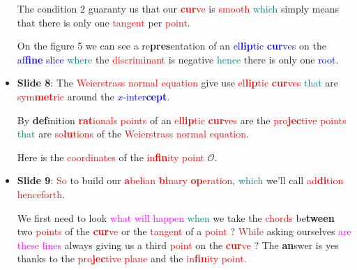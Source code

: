 \begin{itemize}
            The condition 2 guaranty us that our \textcolor{red}{\textbf{cur}ve} is
            \textcolor{red}{smooth} \textcolor{teal}{which} simply means that
            there is only one \textcolor{red}{tangent} per \textcolor{red}{point}.

            On the figure 5 we can see a re\textbf{pres}entation of an \textcolor{blue}{el\textbf{lip}tic \textbf{cur}ves}
            on the \textcolor{blue}{af\textbf{fine}
            slice} \textcolor{teal}{where} the \textcolor{red}{discriminant} is negative \textcolor{teal}{hence} there is only one
            \textcolor{blue}{root}.
        \item \textbf{Slide 8}: The \textcolor{red}{Weierstrass normal
                equation} give use \textcolor{red}{el\textbf{lip}tic
            \textbf{cur}ves} \textcolor{teal}{that} are \textcolor{red}{sym\textbf{met}ric} around the
            \textcolor{blue}{$x$-inter\textbf{cept}}.

            By \textbf{def}inition \textcolor{red}{\textbf{rat}ionals points} of an \textcolor{red}{el\textbf{lip}tic
                \textbf{cur}ves} are the \textcolor{red}{pro\textbf{jec}tive points}
            \textcolor{teal}{that} are \textcolor{red}{so\textbf{lu}tions} of the \textcolor{red}{Weierstrass normal
                equation}.

            Here is the \textcolor{red}{coordinates} of the \textcolor{red}{in\textbf{fin}ity point} $\mathcal{O}$.
        \item \textbf{Slide 9}: \textcolor{brown}{So} to build our \textcolor{red}{\textbf{a}belian \textbf{bi}nary
                \textbf{op}eration}, \textcolor{teal}{which} we'll call
            \textcolor{red}{ad\textbf{di}tion} \textcolor{brown}{henceforth}.

            We first need to
            look \textcolor{magenta}{what will happen} \textcolor{teal}{when} we take the \textcolor{red}{chords} be\textbf{tween}
            two
            \textcolor{red}{points} of the \textcolor{red}{\textbf{cur}ve} or
            the \textcolor{red}{tangent} of a \textcolor{red}{point} ?
            \textcolor{brown}{While} asking ourselves
            \textcolor{magenta}{are these lines} always giving us a third
            \textcolor{red}{point} on the \textcolor{red}{\textbf{cur}ve} ? The \textbf{an}swer is yes thanks to
            the \textcolor{red}{pro\textbf{jec}tive plane} and the
            \textcolor{red}{in\textbf{fin}ity point}.


\end{itemize}
